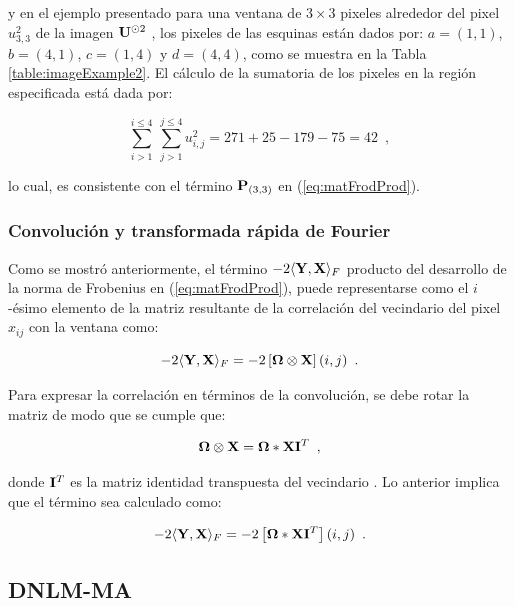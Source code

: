 y en el ejemplo presentado para una ventana de $3\times3$ pixeles alrededor del pixel $u_{3,3}^2$ de la imagen $\mathbf{U}^{\odot2}$ , los pixeles de las esquinas están dados por: $a=\left(1,1\right)$, $b=\left(4,1\right)$,
$c=\left(1,4\right)$ y $d=\left(4,4\right)$, como se muestra en la Tabla \ref{table:imageExample2}. El cálculo de la sumatoria de los pixeles en la región especificada está dada por: 

\begin{equation}
\sum_{i>1}^{i\leq 4}~\sum_{j>1}^{j\leq 4}u_{i,j}^2=271+25-179-75=42 \enspace ,
\end{equation}

lo cual, es consistente con el término $\mathbf{P}_{\left(3,3\right)}$ en (\ref{eq:matFrodProd}). 



\subsubsection{Convolución y transformada rápida de Fourier}

Como se mostró anteriormente, el término $-2\langle\mathbf{Y},\mathbf{X}\rangle_{F}$ producto del desarrollo de la norma de Frobenius en (\ref{eq:matFrodProd}), puede representarse como el $i$-ésimo elemento de la matriz resultante de la correlación del vecindario  del pixel $x_{ij}$ con la ventana \mat{\Omega} como:

\begin{equation}
-2\langle\mathbf{Y},\mathbf{X}\rangle_{F} = -2\left[\mathbf{\Omega} \otimes \mathbf{X}\right](i,j) \enspace .
\end{equation}

Para expresar la correlación en términos de la convolución, se debe rotar la matriz  de modo que se cumple que:

\begin{equation}
\mathbf{\Omega} \otimes \mathbf{X} = \mathbf{\Omega}*\mathbf{X}\mathbf{I}^T \enspace ,
\end{equation}

donde $\mathbf{I}^T$ es la matriz identidad transpuesta del vecindario . Lo anterior implica que el término sea calculado como:

\begin{equation}
-2\langle\mathbf{Y},\mathbf{X}\rangle_{F} = -2\left[\mathbf{\Omega} *\mathbf{X}\mathbf{I}^T\right](i,j) \enspace .
\end{equation}




\subsection{DNLM-MA}
\label{ch:marco_condat}

